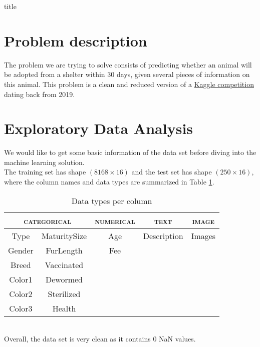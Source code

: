 \documentclass[12pt]{article}
\begin{document}
{title}


\tableofcontents
\listoffigures
\listoftables

{}

\section{Problem description}
The problem we are trying to solve consists of predicting whether an animal will be adopted from a shelter within 30 days, given several pieces of information on this animal. This problem is a clean and reduced version of a \href{https://www.kaggle.com/c/petfinder-adoption-prediction/overview}{Kaggle competition} dating back from 2019.

\section{Exploratory Data Analysis}
We would like to get some basic information of the data set before diving into the machine learning solution. \\
The training set has shape \((8168 \times 16)\) and the test set has shape \((250 \times 16)\), where the column names and data types are summarized in Table \ref{table: column data type}. \\
\begin{table}[!ht]
    \centering
    \begin{tabular}{ccccc}
        \toprule
        \multicolumn{2}{c}{\textsc{categorical}} & \textsc{numerical} & \textsc{text} & \textsc{image}          \\ \midrule
        Type                                     & MaturitySize       & Age           & Description    & Images \\
        Gender                                   & FurLength          & Fee                                     \\
        Breed                                    & Vaccinated                                                   \\
        Color1                                   & Dewormed                                                     \\
        Color2                                   & Sterilized                                                   \\
        Color3                                   & Health                                                       \\
        \bottomrule
    \end{tabular}
    \caption{Data types per column}
    \label{table: column data type}
\end{table} \\
Overall, the data set is very clean as it contains 0 NaN values.
\end{document}
